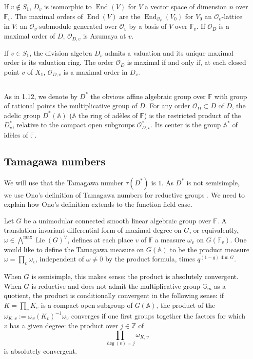 \documentclass[11pt,a4paper]{article}
\theoremstyle{plain}
\theoremstyle{definition}
\DeclareMathOperator{\End}{End}
\DeclareMathOperator{\Lie}{Lie}
\newcommand{\Z}{\mathbb{Z}}
\newcommand{\Gm}{\mathbb{G}_m}
\begin{document}
If $v \notin S_1$, $D_v$ is isomorphic to $\End(V)$ for $V$ a vector space of dimension $n$ over $\mathbb{F}_v$. The maximal orders of $\End(V)$ are the $\End_{\mathcal{O}_v}(V_0)$ for $V_0$ an $\mathcal{O}_v$-lattice in $V$: an $\mathcal{O}_v$-submodule generated over $\mathcal{O}_v$ by a basis of $V$ over $\mathbb{F}_v$. If $\mathcal{O}_D$ is a maximal order of $D$, $\mathcal{O}_{D,v}$ is Azumaya at $v$.

If $v \in S_1$, the division algebra $D_v$ admits a valuation and its unique maximal order is its valuation ring. The order $\mathcal{O}_D$ is maximal if and only if, at each closed point $v$ of $X_1$, $\mathcal{O}_{D,v}$ is a maximal order in $D_v$.

\subsection{}
As in 1.12, we denote by $D^*$ the obvious affine algebraic group over $\mathbb{F}$ with group of rational points the multiplicative group of $D$. For any order $\mathcal{O}_D \subset D$ of $D$, the adelic group $D^*(\mathbb{A})$ ($\mathbb{A}$ the ring of ad\`eles of $\mathbb{F}$) is the restricted product of the $D_v^*$, relative to the compact open subgroups $\mathcal{O}_{D,v}^*$. Its center is the group $\mathbb{A}^*$ of id\`eles of $\mathbb{F}$.

\subsection{Tamagawa numbers}
We will use that the Tamagawa number $\tau(D^*)$ is $1$. As $D^*$ is not semisimple, we use Ono's definition of Tamagawa numbers for reductive groups \cite{O}. We need to explain how Ono's definition extends to the function field case.

Let $G$ be a unimodular connected smooth linear algebraic group over $\mathbb{F}$. A translation invariant differential form of maximal degree on $G$, or equivalently, $\omega \in \bigwedge^{\max} \Lie(G)^\vee$, defines at each place $v$ of $\mathbb{F}$ a measure $\omega_v$ on $G(\mathbb{F}_v)$. One would like to define the Tamagawa measure on $G(\mathbb{A})$ to be the product measure $\omega = \prod_v \omega_v$, independent of $\omega \neq 0$ by the product formula, times $q^{(1-g)\dim G}$.

When $G$ is semisimple, this makes sense: the product is absolutely convergent. When $G$ is reductive and does not admit the multiplicative group $\Gm$ as a quotient, the product is conditionally convergent in the following sense: if $K = \prod_v K_v$ is a compact open subgroup of $G(\mathbb{A})$, the product of the $\omega_{K,v} := \omega_v(K_v)^{-1} \omega_v$ converges if one first groups together the factors for which $v$ has a given degree: the product over $j \in \Z$ of
\[
\prod_{\deg(v)=j} \omega_{K,v}
\]
is absolutely convergent.
\end{document}
